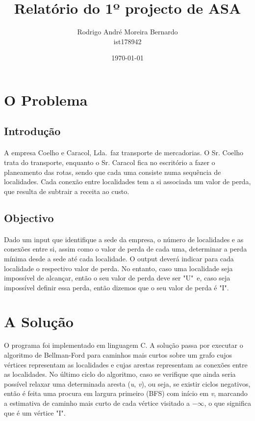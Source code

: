 \documentclass[12pt, a4paper]{article}
\title{\textbf{Relatório do 1º projecto de ASA}}
\author{Rodrigo André Moreira Bernardo \\ ist178942}
\affil{Instituto Superior Técnico}
\date{\today}
\begin{document}
\maketitle

\section{O Problema}

\subsection{Introdução}
\paragraph{}
A empresa Coelho e Caracol, Lda.\ faz transporte de mercadorias. O Sr. Coelho
trata do transporte, enquanto o Sr. Caracol fica no escritório a fazer o
planeamento das rotas, sendo que cada uma consiste numa sequência de
localidades. Cada conexão entre localidades tem a si associada um valor de
perda, que resulta de subtrair a receita ao custo.

\subsection{Objectivo}
\paragraph{}
Dado um input que identifique a sede da empresa, o número de localidades e as
conexões entre si, assim como o valor de perda de cada uma, determinar a perda
mínima desde a sede até cada localidade. O output deverá indicar para cada
localidade o respectivo valor de perda. No entanto, caso uma localidade seja
impossível de alcançar, então o seu valor de perda deve ser "U"\ e, caso seja
impossível definir essa perda, então dizemos que o seu valor de perda é "I".

\section{A Solução}
\paragraph{}
O programa foi implementado em linguagem C.  A solução passa por executar o
algoritmo de Bellman-Ford para caminhos mais curtos sobre um grafo cujos
vértices representam as localidades e cujas arestas representam as conexões
entre as localidades. No último ciclo do algoritmo, caso se verifique que ainda
seria possível relaxar uma determinada aresta (\textit{u}, \textit{v}), ou seja,
se existir ciclos negativos, então é feita uma procura em largura primeiro (BFS)
com início em \textit{v}, marcando a estimativa de caminho mais curto de cada
vértice visitado a $-\infty$, o que significa que é um vértice "I".
\end{document}
